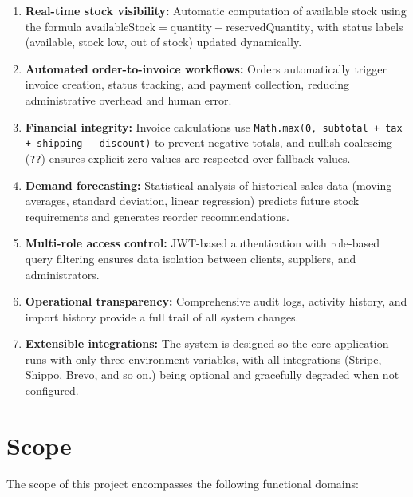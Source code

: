 ﻿\documentclass[12pt,a4paper]{report}
\begin{document}
\begin{enumerate}[leftmargin=1.5em]
  \item \textbf{Real-time stock visibility:} Automatic computation of available stock using the formula $\text{availableStock} = \text{quantity} - \text{reservedQuantity}$, with status labels (available, stock low, out of stock) updated dynamically.
  \item \textbf{Automated order-to-invoice workflows:} Orders automatically trigger invoice creation, status tracking, and payment collection, reducing administrative overhead and human error.
  \item \textbf{Financial integrity:} Invoice calculations use \texttt{Math.max(0, subtotal + tax + shipping - discount)} to prevent negative totals, and nullish coalescing (\texttt{??}) ensures explicit zero values are respected over fallback values.
  \item \textbf{Demand forecasting:} Statistical analysis of historical sales data (moving averages, standard deviation, linear regression) predicts future stock requirements and generates reorder recommendations.
  \item \textbf{Multi-role access control:} JWT-based authentication with role-based query filtering ensures data isolation between clients, suppliers, and administrators.
  \item \textbf{Operational transparency:} Comprehensive audit logs, activity history, and import history provide a full trail of all system changes.
  \item \textbf{Extensible integrations:} The system is designed so the core application runs with only three environment variables, with all integrations (Stripe, Shippo, Brevo, and so on.) being optional and gracefully degraded when not configured.
\end{enumerate}

\section{Scope}

The scope of this project encompasses the following functional domains:
\end{document}
